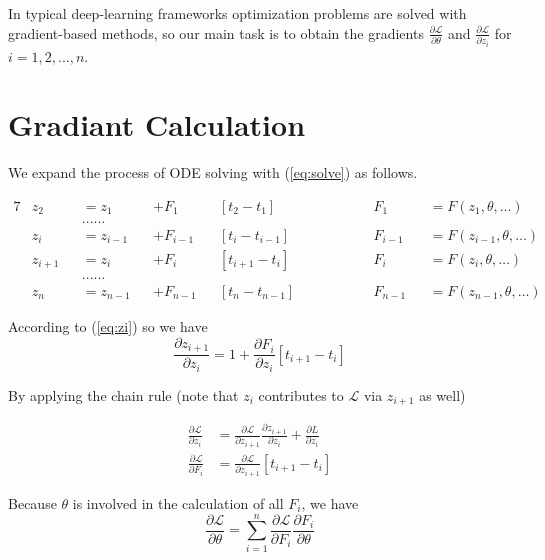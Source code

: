 \documentclass{article}
\newcommand{\LL}{{\mathcal L}}
\begin{document}
In typical deep-learning frameworks optimization problems are solved with gradient-based methods, so
our main task is to obtain the gradients $\frac{\partial \LL}{\partial \theta}$ and $\frac{\partial \LL}{\partial z_i}$ for $i = 1, 2, ..., n$.

\section{Gradiant Calculation}

We expand the process of ODE solving with (\ref{eq:solve}) as follows.

\begin{alignat}{7}
	\nonumber
	&z_2     &&= z_1     &&+ F_1     &&[t_2 - t_1]     \qquad\qquad && F_1  &&= F(z_1, \theta, \dots)&&\\
	\nonumber
	&        && ......   &&          &&                        &&	  && &&\\
	\label{eq:zi_1}
	&z_i     &&= z_{i-1} &&+ F_{i-1} &&[t_i - t_{i-1}] \qquad\qquad && F_{i-1} &&= F(z_{i-1}, \theta, \dots)&&\\
	\label{eq:zi}
	&z_{i+1} &&= z_i     &&+ F_i     &&[t_{i+1} - t_i] \qquad\qquad && F_i     &&= F(z_i, \theta, \dots)&&\\
	\nonumber
	&        && ......   &&          &&                        &&	  && && \\
	\nonumber
	&z_n     &&= z_{n-1} &&+ F_{n-1} &&[t_n - t_{n-1}] \qquad\qquad && F_{n-1} &&= F(z_{n-1},\theta, \dots)&&
\end{alignat}


According to (\ref{eq:zi}) so we have
\begin{equation}
	\label{eq:xx1}
\frac{\partial z_{i+1}}{\partial z_i} = 1 + \frac{\partial F_i}{\partial z_i} [t_{i+1}-t_i]
\end{equation}

By applying the chain rule (note that $z_i$ contributes to $\LL$ via $z_{i+1}$ as well)

\begin{align}
	\label{eq:dzi} \frac{\partial \LL}{\partial z_i} &= \frac{\partial \LL}{\partial z_{i+1}} \frac{\partial z_{i+1}}{\partial z_i} + \frac{\partial L}{\partial z_i}  \\
	\frac{\partial \LL}{\partial F_i} &= \frac{\partial \LL}{\partial z_{i+1}} [t_{i+1} - t_i]
\end{align}

Because $\theta$ is involved in the calculation of all $F_i$, we have
\begin{equation}
	\label{eq:theta}
	\frac{\partial \LL}{\partial \theta} = \sum_{i=1}^{n} \frac{\partial \LL}{\partial F_i} \frac{\partial F_i}{\partial \theta}
\end{equation}
\end{document}
